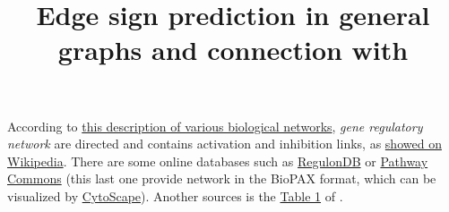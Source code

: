 \documentclass[a4paper,11pt,oneside,onecolumn,openany,notitlepage,final,svgnames]{article}
\title{Edge sign prediction in general graphs and connection with \pcc{}}
\begin{document}
\maketitle

According to \href{https://web.stanford.edu/class/cs224w/slides/handout-bionets.pdf}%
{this description of various biological networks}, \emph{gene regulatory network} are directed and
contains activation and inhibition links, as \href{https://en.wikipedia.org/wiki/Gene_regulatory_network#Overview}%
{showed on Wikipedia}. There are some online databases such as
\href{http://regulondb.ccg.unam.mx/menu/download/datasets/index.jsp}%
{RegulonDB} or \href{http://www.pathwaycommons.org/pcviz/}{Pathway Commons} (this last one provide
network in the BioPAX format, which can be visualized by
\href{http://www.cytoscape.org/}{CytoScape}).
Another sources is the \href{https://www.ncbi.nlm.nih.gov/pmc/articles/PMC2708159/table/T1}{Table 1}
of \autocite{BioSigned09}.

\begingroup
{}
\setlength\bibitemsep{2pt}
\printbibliography
\endgroup
\end{document}
